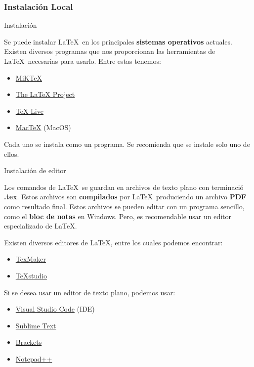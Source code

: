 \documentclass[11pt]{beamer}
\begin{document}
	\subsubsection{Instalación Local}
		\begin{frame}{Instalación}
			\justifying
			
			Se puede instalar \LaTeX\ en los principales \textbf{sistemas operativos} actuales.
		    Existen diversos programas que nos proporcionan las herramientas de 
			\LaTeX\ necesarias para usarlo. Entre estas tenemos:

			\begin{itemize}
				\item \href{https://miktex.org/}{MiKTeX}
				\item \href{https://www.latex-project.org/}{The LaTeX Project}
				\item \href{https://www.tug.org/texlive/}{TeX Live}
				\item \href{https://www.tug.org/mactex/}{MacTeX} (MacOS)
			\end{itemize}


			Cada uno se instala como un programa. Se recomienda que se instale solo
			uno de ellos. 
		\end{frame}
		\begin{frame}{Instalación de editor}
			\justifying

			Los comandos de \LaTeX\ se guardan en archivos de texto plano con terminació
			\textbf{.tex}. Estos archivos son \textbf{compilados} por \LaTeX\ produciendo
			un archivo \textbf{PDF} como resultado final. Estos archivos se pueden
			editar con un programa sencillo, como el \textbf{bloc de notas} en Windows. Pero,
			es recomendable usar un editor especializado de \LaTeX.

			Existen diversos editores de \LaTeX, entre los cuales podemos encontrar:
			\begin{itemize}
				\item \href{https://www.xm1math.net/texmaker/}{TexMaker}
				\item \href{https://www.texstudio.org/}{TeXstudio}
			\end{itemize}

			Si se desea usar un editor de texto plano, podemos usar:
			\begin{itemize}
				\item \href{https://code.visualstudio.com/}{Visual Studio Code} (IDE)
				\item \href{https://www.sublimetext.com/}{Sublime Text}
				\item \href{https://brackets.io/}{Brackets}
				\item \href{https://notepad-plus-plus.org/}{Notepad++}
			\end{itemize}
		\end{frame}
\end{document}

